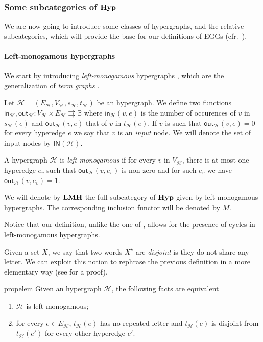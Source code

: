 \documentclass[3p]{elsarticle}
\newcommand{\ind}[1]{\mathsf{in}_{\mathcal{#1}}}
\newcommand{\ino}[1]{\mathsf{IN}({\mathcal{#1}})}
\newcommand{\outd}[1]{\mathsf{out}_{\mathcal{#1}}}
\newcommand{\catname}[1]{\textbf{\textup{#1}}}
\newcommand{\lmo}{\catname{LMH}}
\newcommand{\hyp}{\catname{Hyp}}
\theoremstyle{remark}
\theoremstyle{definition}
\begin{document}
\subsubsection{Some subcategories of $\hyp$}\label{sub:sub}

We are now going to introduce some classes of hypergraphs, and the relative subcategories, which will provide the base for our definitions of EGGs  (cfr.~). 


\paragraph{Left-monogamous hypergraphs}\label{par:lm}
We start by introducing \emph{left-monogamous} hypergraphs \cite{milosavljevic2023string,fritz2023free}, which are the generalization of \emph{term graphs} \cite{CorradiniG05,Plu:TGR-ENTCS}.  

\begin{defi}
	Let $\mathcal{H}=(E_{\mathcal{H}}, V_{\mathcal{H}}, s_{\mathcal{H}}, t_{\mathcal{H}})$ be an hypergraph. We define two functions $\ind{H}, \outd{H}\colon V_{\mathcal{H}}\times E_{\mathcal{H}}\rightrightarrows \mathbb{B}$ where $\ind{H}(v,e)$ is the number of occurences of $v$ in $s_{\mathcal{H}}(e)$ and $\outd{H}(v,e)$ that of $v$ in $t_{\mathcal{H}}(e)$. If $v$ is such that $\outd{H}(v,e)=0$ for every hyperedge $e$ we say that $v$ is an \emph{input} node. We will denote the set of input nodes by $\ino{H}$.
	
	A hypergraph $\mathcal{H}$ is \emph{left-monogamous} if for every $v$ in $V_\mathcal{H}$, there is at most one hyperedge $e_v$ such that $\outd{H}(v,e_v)$ is non-zero and for such $e_v$ we have $\outd{H}(v,e_v) = 1$.
	
	We will denote by $\lmo$ the full subcategory of $\hyp$ given by left-monogamous hypergraphs. The corresponding inclusion functor will be denoted by $M$.
\end{defi}


\begin{rem}Notice that our definition, unlike the one of \cite{fritz2023free}, allows for the presence of cycles in left-monogamous hypergraphs.
\end{rem}

Given a set $X$, we say that two words $X^\star$ are \emph{disjoint} is they do not share any letter. We can exploit this notion to rephrase the previous definition in a more elementary way (see  for a proof).
\begin{restatable}{prop}{elem}\label{rem:elem} Given an hypergraph $\mathcal{H}$, the following facts are equivalent
	\begin{enumerate}
		\item $\mathcal{H}$ is left-monogamous;
		\item for every $e\in E_{\mathcal{H}}$, $t_{\mathcal{H}}(e)$ has no repeated letter and $t_{\mathcal{H}}(e)$ is disjoint from $t_{\mathcal{H}}(e')$ for every other hyperedge $e'$.
	\end{enumerate}
\end{restatable} 
\end{document}

